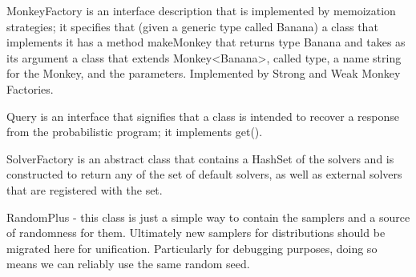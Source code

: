 MonkeyFactory is an interface description that is implemented by memoization strategies; it specifies that (given a generic type called Banana) a class that implements it has a method makeMonkey that returns type Banana and takes as its argument a class that extends Monkey<Banana>, called type, a name string for the Monkey, and the parameters. Implemented by Strong and Weak Monkey Factories.

Query is an interface that signifies that a class is intended to recover a response from the probabilistic program; it implements get().

SolverFactory is an abstract class that contains a HashSet of the solvers and is constructed to return any of the set of default solvers, as well as external solvers that are registered with the set.

RandomPlus - this class is just a simple way to contain the samplers and a source of randomness for them. Ultimately new samplers for distributions should be migrated here for unification. Particularly for debugging purposes, doing so means we can reliably use the same random seed.

